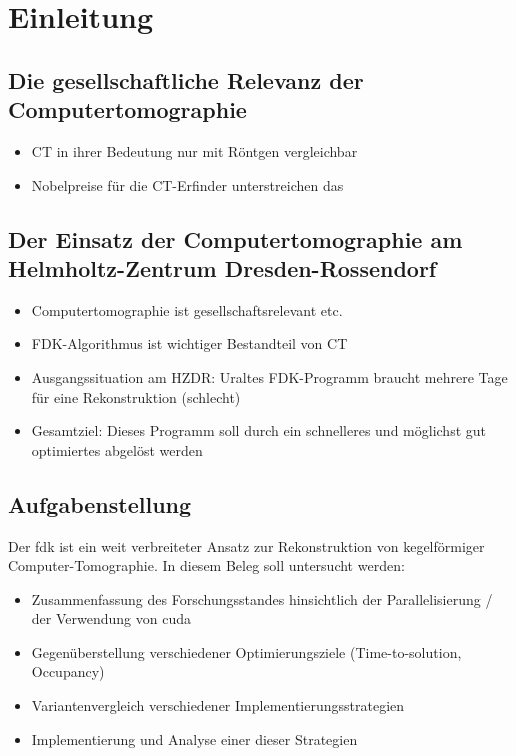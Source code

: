 \chapter{Einleitung}



\section{Die gesellschaftliche Relevanz der Computertomographie}

\begin{itemize}
    \item CT in ihrer Bedeutung nur mit Röntgen vergleichbar
    \item Nobelpreise für die CT-Erfinder unterstreichen das
\end{itemize}

\section{Der Einsatz der Computertomographie am Helmholtz-Zentrum Dresden-Rossendorf}

\begin{itemize}
    \item Computertomographie ist gesellschaftsrelevant etc.
    \item FDK-Algorithmus ist wichtiger Bestandteil von CT
    \item Ausgangssituation am HZDR: Uraltes FDK-Programm braucht mehrere Tage für eine Rekonstruktion (schlecht)
    \item Gesamtziel: Dieses Programm soll durch ein schnelleres und möglichst gut optimiertes abgelöst werden
\end{itemize}

\section{Aufgabenstellung}

Der \gls{fdk} ist ein weit verbreiteter Ansatz zur Rekonstruktion von kegelförmiger Computer-Tomographie. In diesem
Beleg soll untersucht werden:

\begin{itemize}
    \item Zusammenfassung des Forschungsstandes hinsichtlich der Parallelisierung / der Verwendung von \gls{cuda}
    \item Gegenüberstellung verschiedener Optimierungsziele (Time-to-solution, Occupancy)
    \item Variantenvergleich verschiedener Implementierungsstrategien
    \item Implementierung und Analyse einer dieser Strategien
\end{itemize}
